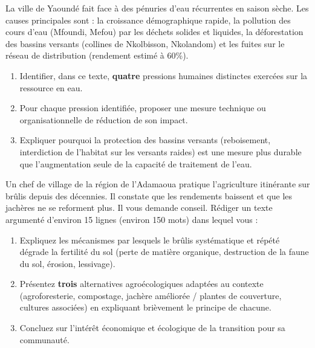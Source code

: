 \documentclass[11pt]{article}
\newcounter{popsec}
\newcounter{popsub}
\newcommand{\courssub}[1]{%
  \stepcounter{popsub}%
  \par\vspace{9pt}\noindent{\popxbold\fontsize{11.5}{13}\selectfont\color{popink}{\color{poporange}\thepopsec.\thepopsub}\hspace{6pt}#1}\par\nopagebreak\vspace{4pt}
}
\begin{document}
\begin{exercice}
La ville de Yaoundé fait face à des pénuries d'eau récurrentes en saison sèche. Les causes principales sont : la croissance démographique rapide, la pollution des cours d'eau (Mfoundi, Mefou) par les déchets solides et liquides, la déforestation des bassins versants (collines de Nkolbisson, Nkolandom) et les fuites sur le réseau de distribution (rendement estimé à 60\%).
\begin{enumerate}
\item Identifier, dans ce texte, \textbf{quatre} pressions humaines distinctes exercées sur la ressource en eau.
\item Pour chaque pression identifiée, proposer une mesure technique ou organisationnelle de réduction de son impact.
\item Expliquer pourquoi la protection des bassins versants (reboisement, interdiction de l'habitat sur les versants raides) est une mesure plus durable que l'augmentation seule de la capacité de traitement de l'eau.
\end{enumerate}
\end{exercice}

\begin{exercice}
Un chef de village de la région de l'Adamaoua pratique l'agriculture itinérante sur brûlis depuis des décennies. Il constate que les rendements baissent et que les jachères ne se reforment plus. Il vous demande conseil.
Rédiger un texte argumenté d'environ 15 lignes (environ 150 mots) dans lequel vous :
\begin{enumerate}
\item Expliquez les mécanismes par lesquels le brûlis systématique et répété dégrade la fertilité du sol (perte de matière organique, destruction de la faune du sol, érosion, lessivage).
\item Présentez \textbf{trois} alternatives agroécologiques adaptées au contexte (agroforesterie, compostage, jachère améliorée / plantes de couverture, cultures associées) en expliquant brièvement le principe de chacune.
\item Concluez sur l'intérêt économique et écologique de la transition pour sa communauté.
\end{enumerate}
\end{exercice}

\courssub{Je me prépare au Probatoire}
\end{document}
